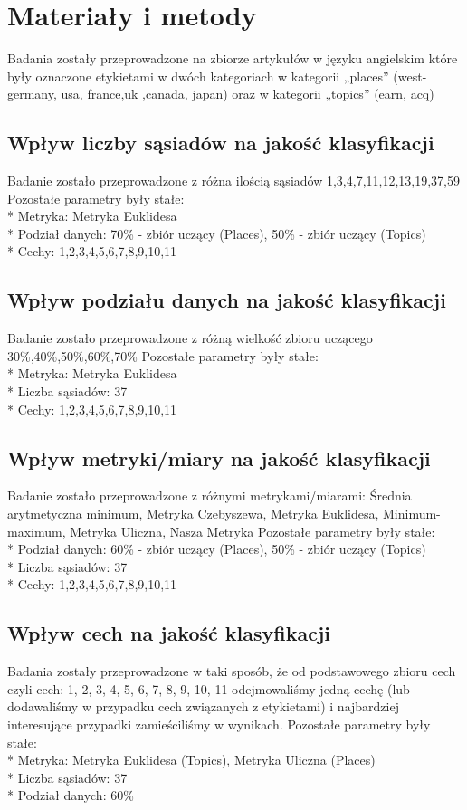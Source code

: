 \documentclass{classrep}
\begin{document}
\section{Materiały i metody}

{
Badania zostały przeprowadzone na zbiorze artykułów w języku angielskim które były oznaczone etykietami w dwóch kategoriach w kategorii „places” (west-germany, usa, france,uk ,canada, japan) oraz w kategorii „topics” (earn, acq) 

\subsection{Wpływ liczby sąsiadów na jakość klasyfikacji}
Badanie zostało przeprowadzone z różna ilością sąsiadów {1,3,4,7,11,12,13,19,37,59}
Pozostałe parametry były stałe:
\\*
Metryka: Metryka Euklidesa
\\*
Podział danych: 70\% - zbiór uczący (Places), 50\% - zbiór uczący (Topics)
\\*
Cechy: 1,2,3,4,5,6,7,8,9,10,11
\subsection{Wpływ podziału danych na jakość klasyfikacji}
Badanie zostało przeprowadzone z różną wielkość zbioru uczącego {30\%,40\%,50\%,60\%,70\%}
Pozostałe parametry były stałe:
\\*
Metryka: Metryka Euklidesa
\\*
Liczba sąsiadów: 37
\\*
Cechy: 1,2,3,4,5,6,7,8,9,10,11
\subsection{Wpływ metryki/miary na jakość klasyfikacji}
Badanie zostało przeprowadzone z różnymi metrykami/miarami: {Średnia arytmetyczna minimum, Metryka Czebyszewa, Metryka Euklidesa, Minimum-maximum, Metryka Uliczna, Nasza Metryka}
Pozostałe parametry były stałe:
\\*
Podział danych: 60\% - zbiór uczący (Places), 50\% - zbiór uczący (Topics)
\\*
Liczba sąsiadów: 37
\\*
Cechy: 1,2,3,4,5,6,7,8,9,10,11
\subsection{Wpływ cech na jakość klasyfikacji}
Badania zostały przeprowadzone w taki sposób, że od podstawowego zbioru cech czyli cech: 1, 2, 3, 4, 5, 6, 7, 8, 9, 10, 11 odejmowaliśmy jedną cechę (lub dodawaliśmy w przypadku cech związanych z etykietami) i najbardziej interesujące przypadki zamieściliśmy w wynikach. 
Pozostałe parametry były stałe:
\\*
Metryka: Metryka Euklidesa (Topics), Metryka Uliczna (Places)
\\*
Liczba sąsiadów: 37
\\*
Podział danych: 60\%
}
\end{document}
